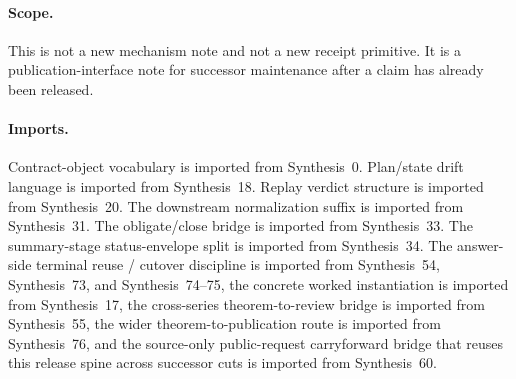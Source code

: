 \documentclass[11pt]{article}
\begin{document}
\paragraph{Scope.}
This is not a new mechanism note and not a new receipt primitive.
It is a publication-interface note for successor maintenance after a claim has already been released.

\paragraph{Imports.}
Contract-object vocabulary is imported from Synthesis~0.\cite{series:contractobjects}
Plan/state drift language is imported from Synthesis~18.\cite{series:planstateequiv}
Replay verdict structure is imported from Synthesis~20.\cite{series:auditorreplay}
The downstream normalization suffix is imported from Synthesis~31.\cite{series:downstreamnormalforms}
The obligate/close bridge is imported from Synthesis~33.\cite{series:releaseclosure}
The summary-stage status-envelope split is imported from Synthesis~34.\cite{series:statusenvelopes}
The answer-side terminal reuse / cutover discipline is imported from Synthesis~54, Synthesis~73, and Synthesis~74--75, the concrete worked instantiation is imported from Synthesis~17, the cross-series theorem-to-review bridge is imported from Synthesis~55, the wider theorem-to-publication route is imported from Synthesis~76, and the source-only public-request carryforward bridge that reuses this release spine across successor cuts is imported from Synthesis~60.\cite{series:challengeanswerreviewmenus,series:pairedterminalcitationdiscipline,series:pairedterminalcutoverrules,series:workedexample,series:seriesspines,series:theoremtopublicationspine,series:publicrequestcarryforward}
\end{document}
